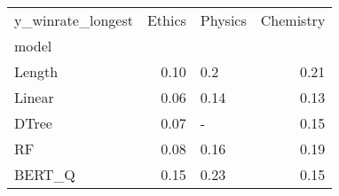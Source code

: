 \begin{tabular}{lrlr}
\toprule
y\_winrate\_longest &  Ethics & Physics &  Chemistry \\
model  &         &         &            \\
\midrule
Length &    0.10 &     0.2 &       0.21 \\
Linear &    0.06 &    0.14 &       0.13 \\
DTree  &    0.07 &       - &       0.15 \\
RF     &    0.08 &    0.16 &       0.19 \\
BERT\_Q &    0.15 &    0.23 &       0.15 \\
\bottomrule
\end{tabular}
